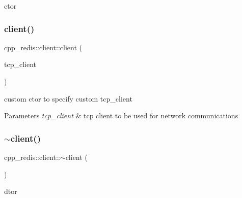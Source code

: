 ctor 

\mbox{\label{classcpp__redis_1_1client_ae879c3a6829a2da9d03f80c1ec4b8d9b}} 
\subsubsection{\texorpdfstring{client()}{client()}\hspace{0.1cm}{\footnotesize\ttfamily [2/3]}}
{\footnotesize\ttfamily cpp\+\_\+redis\+::client\+::client (\begin{DoxyParamCaption}\item[{const std\+::shared\+\_\+ptr$<$ \hyperlink{classcpp__redis_1_1network_1_1tcp__client__iface}{network\+::tcp\+\_\+client\+\_\+iface} $>$ \&}]{tcp\+\_\+client }\end{DoxyParamCaption})\hspace{0.3cm}{\ttfamily [explicit]}}

custom ctor to specify custom tcp\+\_\+client


\begin{DoxyParams}{Parameters}
{\em tcp\+\_\+client} & tcp client to be used for network communications \\
\hline
\end{DoxyParams}
\mbox{\label{classcpp__redis_1_1client_aca7030c8bd6856f10314b2862d1bae79}} 
\subsubsection{\texorpdfstring{$\sim$client()}{~client()}}
{\footnotesize\ttfamily cpp\+\_\+redis\+::client\+::$\sim$client (\begin{DoxyParamCaption}\item[{void}]{ }\end{DoxyParamCaption})}



dtor 

\mbox{\label{classcpp__redis_1_1client_ab938aeb2a144629fd269594e4af08168}} 
